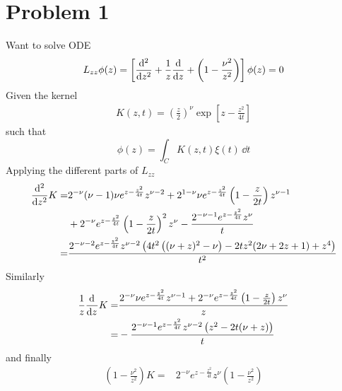 \documentclass[a4paper,12pt]{article}
\begin{document}
\section*{Problem 1}
Want to solve ODE
\begin{equation}
	\begin{aligned}
		L_{zz}\phi(z)=\left[\dv[2]{}{z}+\frac{1}{z}\dv{}{z}+\left(1-\frac{\nu^2}{z^2}\right)\right]\phi(z)=0
	\end{aligned}
\end{equation}
Given the kernel
\begin{equation}
	\begin{aligned}
		K(z,t)=\left(\frac{z}{2}\right)^\nu\exp[z-\frac{z^2}{4t}]
	\end{aligned}
\end{equation}
such that
\begin{equation}
\phi(z)=\int_{C} K(z,t)\xi(t)\, \dd t
\end{equation}
Applying the different parts of $L_{zz}$
\begin{equation}
	\begin{aligned}
		\dv[2]{}{z}K=&2^{-\nu } (\nu -1) \nu  e^{z-\frac{z^2}{4 t}} z^{\nu -2}+2^{1-\nu } \nu  e^{z-\frac{z^2}{4 t}} \left(1-\frac{z}{2 t}\right) z^{\nu -1}\\
		&+2^{-\nu } e^{z-\frac{z^2}{4 t}} \left(1-\frac{z}{2 t}\right)^2 z^{\nu }-\frac{2^{-\nu -1} e^{z-\frac{z^2}{4 t}} z^{\nu }}{t}\\
		=&\frac{2^{-\nu -2} e^{z-\frac{z^2}{4 t}} z^{\nu -2} \left(4 t^2 \left((\nu +z)^2-\nu \right)-2 t z^2 (2 \nu +2 z+1)+z^4\right)}{t^2}
	\end{aligned}
\end{equation}
Similarly
\begin{equation}
	\begin{aligned}
		\frac{1}{z}\dv[]{}{z}K=&\frac{2^{-\nu } \nu  e^{z-\frac{z^2}{4 t}} z^{\nu -1}+2^{-\nu } e^{z-\frac{z^2}{4 t}} \left(1-\frac{z}{2 t}\right) z^{\nu }}{z}\\
		=&-\frac{2^{-\nu -1} e^{z-\frac{z^2}{4 t}} z^{\nu -2} \left(z^2-2 t (\nu +z)\right)}{t}
	\end{aligned}
\end{equation}
and finally 
\begin{equation}
	\begin{aligned}
		\left(1-\frac{\nu^2}{z^2}\right)K=&2^{-\nu } e^{z-\frac{z^2}{4 t}} z^{\nu } \left(1-\frac{\nu ^2}{z^2}\right)
	\end{aligned}
\end{equation}
\end{document}
